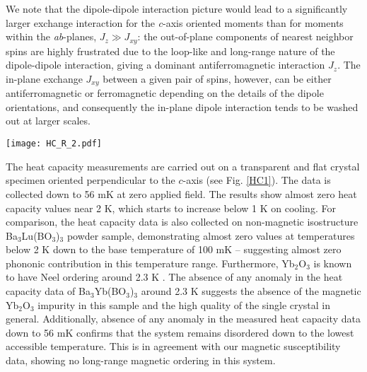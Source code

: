 \documentclass[aps,prl,reprint,showpacs,showkeys,superscriptaddress,floatfix,twocolumn]{revtex4-2}
\newcommand{\bybo}{Ba$_3$Yb(BO$_3$)$_3$}
\newcommand{\blbo}{Ba$_3$Lu(BO$_3$)$_3$}
\begin{document}
We note that the dipole-dipole interaction picture would lead to a significantly larger exchange interaction for the \textit{c}-axis oriented moments than for moments within the \textit{ab}-planes, $J_z \gg J_{xy}$: the out-of-plane components of nearest neighbor spins are highly frustrated due to the loop-like and long-range nature of the dipole-dipole interaction, giving a dominant antiferromagnetic interaction $J_z$. The in-plane exchange $J_{xy}$ between a given pair of spins, however, can be either antiferromagnetic or ferromagnetic depending on the details of the dipole orientations, and consequently the in-plane dipole interaction tends to be washed out at larger scales. 

\begin{figure*}[htbp]\centering\texttt{[image: HC\_R\_2.pdf]}
	\caption{(a) The heat capacity results obtained for single crystalline \bybo{} and powder \blbo ~ samples are shown. Inset shows the heat capacity data (blue) and fit based on Eq.~\eqref{eq:cp_dipole} (red) as a function of $1/T^2$ at intermediate temperature range $0.5\,\text{K} \lesssim T \lesssim 4\,\text{K}$. (b) Heat capacity data plotted for various magnetic fields with fits (red solid lines) calculated for magnetic Schottky contribution, C$_{Sch}$(T, H)-- see Eq. \ref{Sch}. Inset shows the energy gap, $\Delta$(H) (left vertical- axis)) and `n' representing the number of free spins per f.u. (right vertical-axis) as function of applied magnetic fields. (c) Magnetic heat capacity $C_{mag}$ (left Y-axis, open symbols) of \bybo{} carried out under different magnetic fields are shown versus logarithmic temperature axis. The change in magnetic entropy ($\Delta$S$_{mag}$ = S(K)$-$S(56 mK), right vertical-axis, solid symbols) are plotted with linear temperature shown on the top-axis.}
	\label{HC1}
\end{figure*} 

The heat capacity measurements are carried out on a transparent and flat crystal specimen oriented perpendicular to the $c$-axis (see Fig. \ref{HC1}). The data is collected down to 56 mK at zero applied field. The results show almost zero heat capacity values near 2 K, which starts to increase below 1 K on cooling. For comparison, the heat capacity data is also collected on non-magnetic isostructure \blbo{}  powder sample, demonstrating almost zero values at temperatures below 2 K down to the base temperature of 100 mK -- suggesting almost zero phononic contribution in this temperature range. Furthermore, Yb$_2$O$_3$ is known to have Neel ordering around 2.3 K  \cite{MoonPR1968}. The absence of any anomaly in the heat capacity data of \bybo{} around 2.3 K suggests the absence of the magnetic Yb$_2$O$_3$ impurity in this sample and the high quality of the single crystal in general. Additionally, absence of any  anomaly in the measured heat capacity data down to 56 mK confirms that the system remains disordered down to the lowest accessible temperature. This is in agreement with our magnetic susceptibility data, showing no long-range magnetic ordering in this system. 
\end{document}

